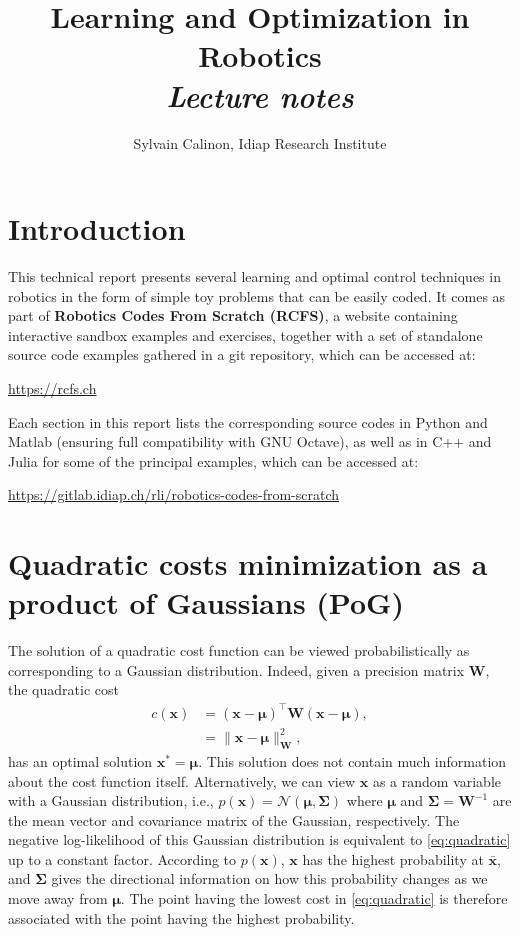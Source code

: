 \documentclass[10pt,a4paper]{article} %
\title{\huge Learning and Optimization in Robotics\\[4mm]\emph{Lecture notes}}
\author{Sylvain Calinon, Idiap Research Institute}
\date{}
\newcommand{\trsp}{{\scriptscriptstyle\top}}
\begin{document}
\maketitle
\vspace{-14mm}
\tableofcontents

\section{Introduction}

This technical report presents several learning and optimal control techniques in robotics in the form of simple toy problems that can be easily coded. It comes as part of \textbf{Robotics Codes From Scratch (RCFS)}, a website containing interactive sandbox examples and exercises, together with a set of standalone source code examples gathered in a git repository, which can be accessed at:
\begin{center}
\url{https://rcfs.ch}
\end{center}%

Each section in this report lists the corresponding source codes in Python and Matlab (ensuring full compatibility with GNU Octave), as well as in C++ and Julia for some of the principal examples, which can be accessed at:
\begin{center}
\url{https://gitlab.idiap.ch/rli/robotics-codes-from-scratch}
\end{center}

\section{Quadratic costs minimization as a product of Gaussians (PoG)}\label{sec:PoG}

The solution of a quadratic cost function can be viewed probabilistically as corresponding to a Gaussian distribution. Indeed, given a precision matrix $\bm{W}$, the quadratic cost
\begin{align}
	c(\bm{x}) &= (\bm{x}-\bm{\mu})^\trsp \bm{W} (\bm{x}-\bm{\mu}),\\
	&= \|\bm{x}-\bm{\mu}\|_{\bm{W}}^2,
	\label{eq:quadratic}
\end{align}
has an optimal solution $\bm{x}^* = \bm{\mu}$. This solution does not contain much information about the cost function itself. Alternatively, we can view $\bm{x}$ as a random variable with a Gaussian distribution, i.e., $p(\bm{x}) = \mathcal{N}(\bm{\mu}, \bm{\Sigma})$ where $\bm{\mu}$ and $\bm{\Sigma}=\bm{W}^{-1}$ are the mean vector and covariance matrix of the Gaussian, respectively. The negative log-likelihood of this Gaussian distribution is equivalent to \eqref{eq:quadratic} up to a constant factor. According to $p(\bm{x})$, $\bm{x}$ has the highest probability at $\bar{\bm{x}}$, and $\bm{\Sigma}$ gives the directional information on how this probability changes as we move away from $\bm{\mu}$. The point having the lowest cost in \eqref{eq:quadratic} is therefore associated with the point having the highest probability. 
\end{document}
